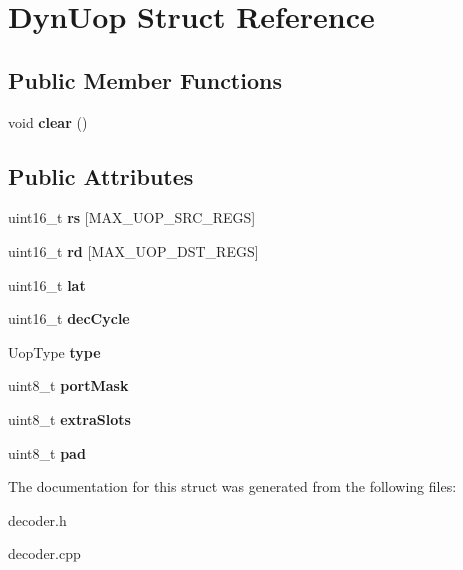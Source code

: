 \hypertarget{structDynUop}{\section{Dyn\-Uop Struct Reference}
\label{structDynUop}
}
\subsection*{Public Member Functions}
\begin{DoxyCompactItemize}
\item 
\hypertarget{structDynUop_a96f4472cb4f8cc87716dee750e5892b6}{void {\bfseries clear} ()}\label{structDynUop_a96f4472cb4f8cc87716dee750e5892b6}

\end{DoxyCompactItemize}
\subsection*{Public Attributes}
\begin{DoxyCompactItemize}
\item 
\hypertarget{structDynUop_a1204f8a686324e3826eedf3315c69b31}{uint16\-\_\-t {\bfseries rs} \mbox{[}M\-A\-X\-\_\-\-U\-O\-P\-\_\-\-S\-R\-C\-\_\-\-R\-E\-G\-S\mbox{]}}\label{structDynUop_a1204f8a686324e3826eedf3315c69b31}

\item 
\hypertarget{structDynUop_a6ff81982a3a12efb287f8fa82b721b1a}{uint16\-\_\-t {\bfseries rd} \mbox{[}M\-A\-X\-\_\-\-U\-O\-P\-\_\-\-D\-S\-T\-\_\-\-R\-E\-G\-S\mbox{]}}\label{structDynUop_a6ff81982a3a12efb287f8fa82b721b1a}

\item 
\hypertarget{structDynUop_a8f4dd7055e58cce2acd4a21d7866f911}{uint16\-\_\-t {\bfseries lat}}\label{structDynUop_a8f4dd7055e58cce2acd4a21d7866f911}

\item 
\hypertarget{structDynUop_a51505d0954480a5b856a4b9342357f48}{uint16\-\_\-t {\bfseries dec\-Cycle}}\label{structDynUop_a51505d0954480a5b856a4b9342357f48}

\item 
\hypertarget{structDynUop_a5a309347ba3cd03722933cc76d602901}{Uop\-Type {\bfseries type}}\label{structDynUop_a5a309347ba3cd03722933cc76d602901}

\item 
\hypertarget{structDynUop_a70216f1b9716267522764b6bf87df694}{uint8\-\_\-t {\bfseries port\-Mask}}\label{structDynUop_a70216f1b9716267522764b6bf87df694}

\item 
\hypertarget{structDynUop_a34d22710b2f2a95b0012ca52d2b5676e}{uint8\-\_\-t {\bfseries extra\-Slots}}\label{structDynUop_a34d22710b2f2a95b0012ca52d2b5676e}

\item 
\hypertarget{structDynUop_ab46ee8d7a4e65c672e47a9c162704f76}{uint8\-\_\-t {\bfseries pad}}\label{structDynUop_ab46ee8d7a4e65c672e47a9c162704f76}

\end{DoxyCompactItemize}


The documentation for this struct was generated from the following files\-:\begin{DoxyCompactItemize}
\item 
decoder.\-h\item 
decoder.\-cpp\end{DoxyCompactItemize}
